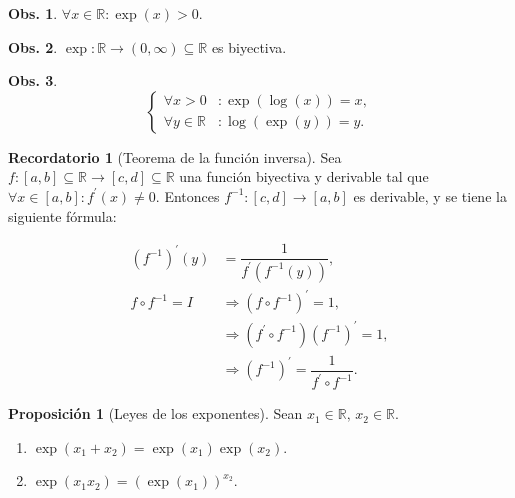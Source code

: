 \documentclass{article}
\theoremstyle{definicion}
\theoremstyle{definition}             %
\theoremstyle{definition}             %
\theoremstyle{definition}
\newtheorem{record}{Recordatorio}
\theoremstyle{definition}
\theoremstyle{observacion}
\newtheorem{obs}{Obs.}
\theoremstyle{definition}
\newtheorem{prop}{Proposición}
\theoremstyle{plain}
\theoremstyle{definition}
\theoremstyle{afirmacion}
\theoremstyle{definition}
\begin{document}
    \begin{obs}
        \(\forall x\in\mathbb{R} \colon \exp(x) > 0.\)
    \end{obs}

    \begin{obs}
        \(\exp \colon \mathbb{R} \to (0,\infty) \subseteq \mathbb{R}\) es biyectiva.    
    \end{obs}

    \begin{obs}
        \vphantom{fdasjfldjfksadjflksafafaklsjfa}
        \begin{equation*}
            \begin{cases}
                \forall x > 0 &\colon \exp(\log(x)) = x,\\
                \forall y \in \mathbb{R} &\colon \log(\exp(y)) = y.
            \end{cases}
        \end{equation*}
    \end{obs}

    \begin{record}[Teorema de la función inversa]
        Sea \(f \colon [a,b]\subseteq \mathbb{R} \to [c,d]\subseteq \mathbb{R}\) una función biyectiva y derivable tal que \(\forall x\in[a,b] \colon f^{\prime}(x) \neq 0\). Entonces \(f^{-1} \colon [c,d] \to [a,b]\) es derivable, y se tiene la siguiente fórmula:

        \begin{align*}
            (f^{-1})^{\prime}(y) &= \dfrac{1}{f^{\prime}(f^{-1}(y))},\\
            f \circ f^{-1} = I &\Rightarrow (f \circ f^{-1})^{\prime} = 1,\\
            &\Rightarrow (f^{\prime} \circ f^{-1})(f^{-1})^{\prime} = 1,\\
            &\Rightarrow (f^{-1})^{\prime} = \dfrac{1}{f^{\prime} \circ f^{-1}}.
        \end{align*}
    \end{record}

    \begin{prop}[Leyes de los exponentes]
        Sean \(x_{1}\in\mathbb{R},\, x_{2}\in\mathbb{R}\).
        
        \begin{enumerate}[label = \roman*)]
            \item \(\exp(x_{1} + x_{2}) = \exp(x_{1})\exp(x_{2})\).
            \item \(\exp(x_{1}x_{2}) = (\exp(x_{1}))^{x_{2}}\).
        \end{enumerate}
    \end{prop}
\end{document}
